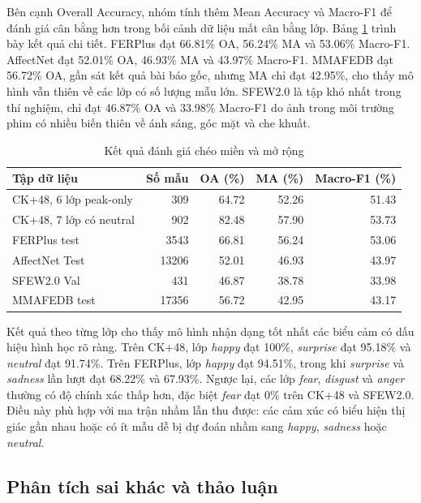 Bên cạnh Overall Accuracy, nhóm tính thêm Mean Accuracy và Macro-F1 để đánh giá cân bằng hơn trong bối cảnh dữ liệu mất cân bằng lớp. Bảng \ref{tab:cross_dataset_results} trình bày kết quả chi tiết. FERPlus đạt 66.81\% OA, 56.24\% MA và 53.06\% Macro-F1. AffectNet đạt 52.01\% OA, 46.93\% MA và 43.97\% Macro-F1. MMAFEDB đạt 56.72\% OA, gần sát kết quả bài báo gốc, nhưng MA chỉ đạt 42.95\%, cho thấy mô hình vẫn thiên về các lớp có số lượng mẫu lớn. SFEW2.0 là tập khó nhất trong thí nghiệm, chỉ đạt 46.87\% OA và 33.98\% Macro-F1 do ảnh trong môi trường phim có nhiều biến thiên về ánh sáng, góc mặt và che khuất.

\begin{table}[htbp]
\centering
\caption{Kết quả đánh giá chéo miền và mở rộng}
\label{tab:cross_dataset_results}
\begin{tabular}{lrrrr}
\hline
\textbf{Tập dữ liệu} & \textbf{Số mẫu} & \textbf{OA (\%)} & \textbf{MA (\%)} & \textbf{Macro-F1 (\%)} \\
\hline
CK+48, 6 lớp peak-only & 309 & 64.72 & 52.26 & 51.43 \\
CK+48, 7 lớp có neutral & 902 & 82.48 & 57.90 & 53.73 \\
FERPlus test & 3543 & 66.81 & 56.24 & 53.06 \\
AffectNet Test & 13206 & 52.01 & 46.93 & 43.97 \\
SFEW2.0 Val & 431 & 46.87 & 38.78 & 33.98 \\
MMAFEDB test & 17356 & 56.72 & 42.95 & 43.17 \\
\hline
\end{tabular}
\end{table}

Kết quả theo từng lớp cho thấy mô hình nhận dạng tốt nhất các biểu cảm có dấu hiệu hình học rõ ràng. Trên CK+48, lớp \textit{happy} đạt 100\%, \textit{surprise} đạt 95.18\% và \textit{neutral} đạt 91.74\%. Trên FERPlus, lớp \textit{happy} đạt 94.51\%, trong khi \textit{surprise} và \textit{sadness} lần lượt đạt 68.22\% và 67.93\%. Ngược lại, các lớp \textit{fear}, \textit{disgust} và \textit{anger} thường có độ chính xác thấp hơn, đặc biệt \textit{fear} đạt 0\% trên CK+48 và SFEW2.0. Điều này phù hợp với ma trận nhầm lẫn thu được: các cảm xúc có biểu hiện thị giác gần nhau hoặc có ít mẫu dễ bị dự đoán nhầm sang \textit{happy}, \textit{sadness} hoặc \textit{neutral}.


\subsection{Phân tích sai khác và thảo luận}

